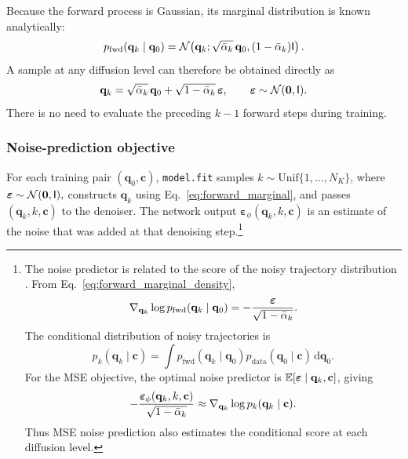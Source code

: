 Because the forward process is Gaussian, its marginal distribution is known analytically:
\begin{equation}
    p_{\mathrm{fwd}}
    (\mathbf{q}_k\mid\mathbf{q}_0)
    =
    \mathcal{N}\!\left(
        \mathbf{q}_k;
        \sqrt{\bar{\alpha}_k}\,\mathbf{q}_0,
        (1-\bar{\alpha}_k)\mathsf{I}
    \right).
    \label{eq:forward_marginal_density}
\end{equation}
A sample at any diffusion level can therefore be obtained directly as
\begin{equation}
    \mathbf{q}_k
    =
    \sqrt{\bar{\alpha}_k}\,\mathbf{q}_0
    +
    \sqrt{1-\bar{\alpha}_k}\,
    \boldsymbol{\varepsilon},
    \qquad
    \boldsymbol{\varepsilon}
    \sim
    \mathcal{N}(\mathbf{0},\mathsf{I}).
    \label{eq:forward_marginal}
\end{equation}
There is no need to evaluate the preceding $k-1$ forward steps during training.

\subsubsection{Noise-prediction objective}

For each training pair $(\mathbf{q}_0,\mathbf{c})$,
\texttt{model.fit} samples $ k\sim\mathrm{Unif}\{1,\ldots,N_K\}$, where $\boldsymbol{\varepsilon}\sim\mathcal{N}(\mathbf{0},\mathsf{I}),$ constructs $\mathbf{q}_k$ using Eq.~\eqref{eq:forward_marginal}, and passes $(\mathbf{q}_k,k,\mathbf{c})$ to the denoiser. The network output $\boldsymbol{\varepsilon}_\phi(\mathbf{q}_k,k,\mathbf{c}) $ is an estimate of the noise that was added at that denoising step.\footnote{The noise predictor is related to the score of the noisy trajectory distribution
\cite{hyvarinen2005score,vincent2011connection}. From
Eq.~\eqref{eq:forward_marginal_density},
\begin{equation}
    \nabla_{\mathbf{q}_k}
    \log
    p_{\mathrm{fwd}}
    (\mathbf{q}_k\mid\mathbf{q}_0)
    =
    -
    \frac{
        \boldsymbol{\varepsilon}
    }{
        \sqrt{1-\bar{\alpha}_k}
    }.
    \label{eq:conditional_score}
\end{equation}
The conditional distribution of noisy trajectories is
\begin{equation}
    p_k(\mathbf{q}_k\mid\mathbf{c})
    =
    \int
    p_{\mathrm{fwd}}
    (\mathbf{q}_k\mid\mathbf{q}_0)
    p_{\mathrm{data}}
    (\mathbf{q}_0\mid\mathbf{c})
    \,\mathrm{d}\mathbf{q}_0.
    \label{eq:conditional_noisy_density}
\end{equation}
For the MSE objective, the optimal noise predictor is $\mathbb{E}[ \boldsymbol{\varepsilon} \mid \mathbf{q}_k,\mathbf{c}]$, giving
\begin{equation}
    -
    \frac{
        \boldsymbol{\varepsilon}_\phi
        (\mathbf{q}_k,k,\mathbf{c})
    }{
        \sqrt{1-\bar{\alpha}_k}
    }
    \approx
    \nabla_{\mathbf{q}_k}
    \log
    p_k(\mathbf{q}_k\mid\mathbf{c}).
    \label{eq:data_score}
\end{equation}
Thus MSE noise prediction also estimates the conditional score at each diffusion level.}


